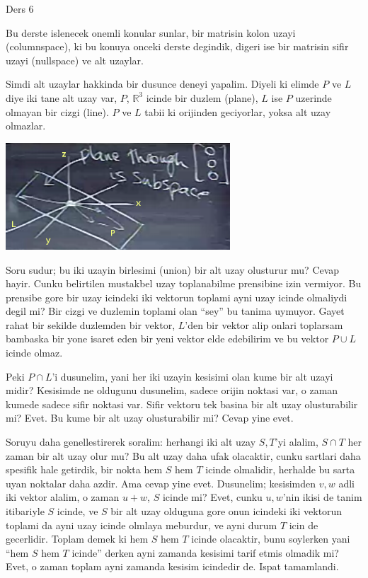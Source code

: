 \documentclass[12pt,fleqn]{article}\usepackage{../common}
\begin{document}
Ders 6

Bu derste islenecek onemli konular sunlar, bir matrisin kolon uzayi
(columnspace), ki bu konuya onceki derste degindik, digeri ise bir
matrisin sifir uzayi (nullspace) ve alt uzaylar. 

Simdi alt uzaylar hakkinda bir dusunce deneyi yapalim. Diyeli ki elimde $P$
ve $L$ diye iki tane alt uzay var, $P$, $\mathbb{R}^3$ icinde bir duzlem
(plane), $L$ ise $P$ uzerinde olmayan bir cizgi (line). $P$ ve $L$ tabii ki
orijinden geciyorlar, yoksa alt uzay olmazlar. 

\includegraphics[height=4cm]{6_01.png}

Soru sudur; bu iki uzayin birlesimi (union) bir alt uzay olusturur mu?
Cevap hayir. Cunku belirtilen mustakbel uzay toplanabilme prensibine izin
vermiyor. Bu prensibe gore bir uzay icindeki iki vektorun toplami ayni uzay
icinde olmaliydi degil mi? Bir cizgi ve duzlemin toplami olan ``sey'' bu
tanima uymuyor. Gayet rahat bir sekilde duzlemden bir vektor, $L$'den bir
vektor alip onlari toplarsam bambaska bir yone isaret eden bir yeni vektor
elde edebilirim ve bu vektor $P \cup L$ icinde olmaz.

Peki $P \cap L$'i dusunelim, yani her iki uzayin kesisimi olan kume bir
alt uzayi midir? Kesisimde ne oldugunu dusunelim, sadece orijin noktasi
var, o zaman kumede sadece sifir noktasi var. Sifir vektoru tek basina bir
alt uzay olusturabilir mi? Evet. Bu kume bir alt uzay olusturabilir mi?
Cevap yine evet. 

Soruyu daha genellestirerek soralim: herhangi iki alt uzay $S,T$'yi alalim,
$S \cap T$ her zaman bir alt uzay olur mu? Bu alt uzay daha ufak olacaktir,
cunku sartlari daha spesifik hale getirdik, bir nokta hem $S$ hem $T$
icinde olmalidir, herhalde bu sarta uyan noktalar daha azdir. Ama cevap
yine evet. Dusunelim; kesisimden $v,w$ adli iki vektor alalim, o zaman
$u + w$, $S$ icinde mi? Evet, cunku $u,w$'nin ikisi de tanim itibariyle $S$
icinde, ve $S$ bir alt uzay olduguna gore onun icindeki iki vektorun
toplami da ayni uzay icinde olmlaya meburdur, ve ayni durum $T$ icin de
gecerlidir. Toplam demek ki hem $S$ hem $T$ icinde olacaktir, bunu
soylerken yani ``hem $S$ hem $T$ icinde'' derken ayni zamanda kesisimi
tarif etmis olmadik mi? Evet, o zaman toplam ayni zamanda kesisim icindedir
de. Ispat tamamlandi. 
\end{document}
